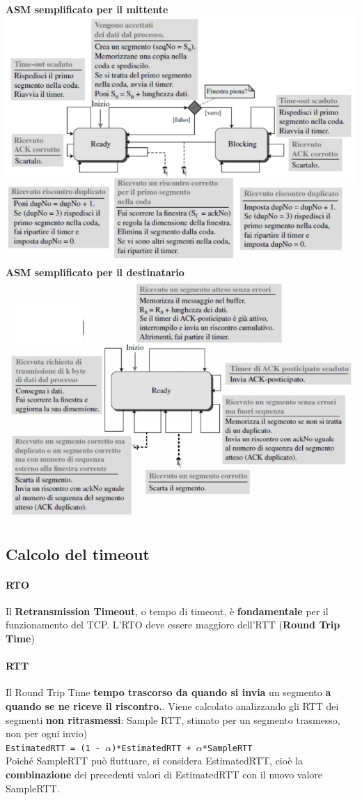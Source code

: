 \documentclass[10pt]{article}
\begin{document}
\begin{center}
\textbf{ASM semplificato per il mittente}
\includegraphics[scale=0.6]{tcpasmmit.png}\\
\textbf{ASM semplificato per il destinatario}
\includegraphics[scale=0.6]{tcpasmdest.png}
\end{center}
\pagebreak
\subsection{Calcolo del timeout}
\paragraph{RTO} Il \textbf{Retransmission Timeout}, o tempo di timeout, è \textbf{fondamentale} per il funzionamento del TCP. L'RTO deve essere maggiore dell'RTT (\textbf{Round Trip Time})
\paragraph{RTT} Il Round Trip Time \textbf{tempo trascorso da quando si invia} un segmento \textbf{a quando se ne riceve il riscontro.}. Viene calcolato analizzando gli RTT dei segmenti \textbf{non ritrasmessi}: Sample RTT, stimato per un segmento trasmesso, non per ogni invio)\\
\texttt{EstimatedRTT = (1 - $\alpha$)*EstimatedRTT + $\alpha$*SampleRTT}\\
Poiché SampleRTT può fluttuare, si considera EstimatedRTT, cioè la \textbf{combinazione} dei precedenti valori di EstimatedRTT con il nuovo valore SampleRTT.
\end{document}
